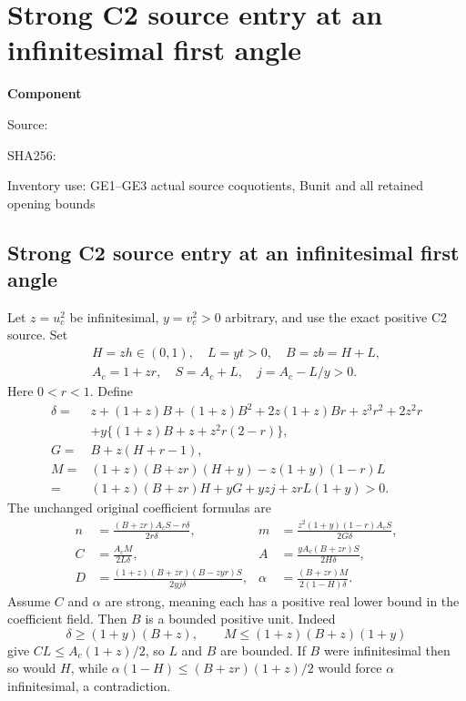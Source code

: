\chapter{Strong C2 source entry at an infinitesimal first angle}
\label{component:pf5726218aec8}
\noindent\textbf{Component }\par
{\small\noindent Source: \par}
{\small\noindent SHA256: \par}
{\small\noindent Inventory use: GE1--GE3 actual source coquotients, Bunit and all retained opening bounds\par}
\medskip
\section{Strong C2 source entry at an infinitesimal first angle}
\label{pf5726218aec8:sec:strong-angle-entry}
Let $z=u_c^2$ be infinitesimal, $y=v_c^2>0$ arbitrary, and use the exact
positive C2 source. Set
\[
 \begin{gathered}
 H=zh\in(0,1),\quad L=yt>0,\quad B=zb=H+L,\\
 A_c=1+zr,\quad S=A_c+L,\quad j=A_c-L/y>0.
 \end{gathered}
\]
Here $0<r<1$. Define
\begin{align*}
 \delta={}&z+(1+z)B+(1+z)B^2+2z(1+z)Br+z^3r^2+2z^2r\\
 &+y\{(1+z)B+z+z^2r(2-r)\},\\
 G={}&B+z(H+r-1),\\
 M={}&(1+z)(B+zr)(H+y)-z(1+y)(1-r)L\\
 ={}&(1+z)(B+zr)H+yG+yzj+zrL(1+y)>0.
\end{align*}
The unchanged original coefficient formulas are
\begin{align*}
 n&=\frac{(B+zr)A_cS-r\delta}{2r\delta},&
 m&=\frac{z^2(1+y)(1-r)A_cS}{2G\delta},\\
 C&=\frac{A_cM}{2L\delta},&
 A&=\frac{yA_c(B+zr)S}{2H\delta},\\
 D&=\frac{(1+z)(B+zr)(B-zyr)S}{2yj\delta},&
 \alpha&=\frac{(B+zr)M}{2(1-H)\delta}.
\tag{GE1}
\end{align*}
Assume $C$ and $\alpha$ are strong, meaning each has a positive real
lower bound in the coefficient field. Then $B$ is a bounded positive
unit. Indeed
\[
 \delta\ge(1+y)(B+z),\qquad
 M\le(1+z)(B+z)(1+y)
\]
give $CL\le A_c(1+z)/2$, so $L$ and $B$ are bounded.
If $B$ were infinitesimal then so would $H$, while
$\alpha(1-H)\le(B+zr)(1+z)/2$ would force $\alpha$ infinitesimal,
a contradiction.

